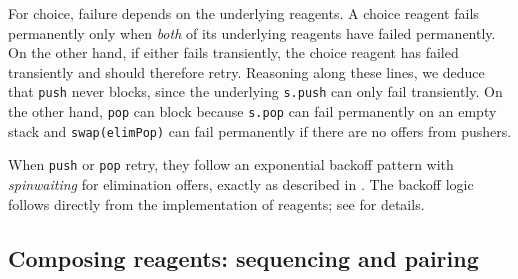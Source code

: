 \documentclass[preprint]{sigplanconf}
\begin{document}
For choice, failure depends on the underlying reagents.  A choice
reagent fails permanently only when \emph{both} of its underlying
reagents have failed permanently.  On the other hand, if either fails
transiently, the choice reagent has failed transiently and should
therefore retry.  Reasoning along these lines, we deduce that
\lstinline{push} never blocks, since the underlying \lstinline{s.push}
can only fail transiently.  On the other hand, \lstinline{pop} can
block because \lstinline{s.pop} can fail permanently on an empty stack
and \lstinline{swap(elimPop)} can fail permanently if there are no
offers from pushers.

When \lstinline{push} or \lstinline{pop} retry, they follow an
exponential backoff pattern with \emph{spinwaiting} for elimination
offers, exactly as described in .  The backoff
logic follows directly from the implementation of reagents; see
 for details.



\subsection{Composing reagents: sequencing and pairing}
\label{sec:conjunction}
\end{document}
